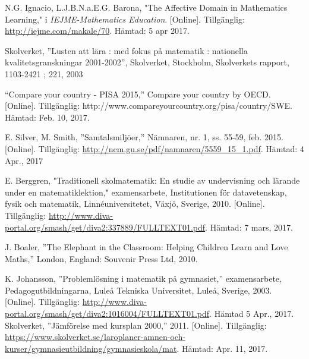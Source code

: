     N.G. Ignacio, L.J.B.N.a.E.G. Barona, "The Affective Domain in Mathematics Learning," i \textsl{IEJME-Mathematics Education}. [Online]. Tillgänglig: \url{http://iejme.com/makale/70}. Hämtad: 5 apr 2017.
    
    Skolverket, ''Lusten att l{\"a}ra : med fokus p{\aa} matematik : nationella kvalitetsgranskningar 2001-2002'',  Skolverket, Stockholm, Skolverkets rapport, 1103-2421 ; 221, 2003
    
   
    
    “Compare your country - PISA 2015,” Compare your country by OECD. [Online]. Tillgänglig: http://www.compareyourcountry.org/pisa/country/SWE. Hämtad: Feb. 10, 2017.
    
    E. Silver, M. Smith, ''Samtalsmiljöer,'' Nämnaren, nr. 1, ss. 55-59, feb. 2015. [Online]. Tillgänglig: \url{http://ncm.gu.se/pdf/namnaren/5559_15_1.pdf}. Hämtad: 4 Apr., 2017
    
    E. Berggren, "Traditionell skolmatematik: En studie av undervisning och lärande under en matematiklektion," examensarbete, Institutionen för datavetenskap, fysik och matematik, Linnéuniversitetet, Växjö, Sverige, 2010. [Online]. Tillgänglig: \url{http://www.diva-portal.org/smash/get/diva2:337889/FULLTEXT01.pdf}. Hämtad: 7 mars, 2017.
    
    
    J. Boaler, ''The Elephant in the Classroom: Helping Children Learn and Love Maths,'' 
    London,
    England: Souvenir Press Ltd, 
    2010. 
    
    K. Johansson, ''Problemlösning i matematik på gymnasiet,'' examensarbete, Pedagogutbildningarna, Luleå Tekniska Universitet, Luleå, Sverige, 2003. [Online]. Tillgänglig: \url{http://www.diva-portal.org/smash/get/diva2:1016004/FULLTEXT01.pdf}. Hämtad 5 Apr., 2017.
    Skolverket, ''Jämförelse med kursplan 2000,'' 2011. [Online]. Tillgänglig: \url{https://www.skolverket.se/laroplaner-amnen-och-kurser/gymnasieutbildning/gymnasieskola/mat}. Hämtad: Apr. 11, 2017.
    
